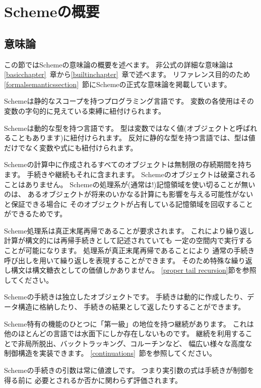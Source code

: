 
\chapter{Schemeの概要}

\section{意味論}
\label{semanticsection}

この節ではSchemeの意味論の概要を述べます。
非公式の詳細な意味論は\ref{basicchapter}~章から\ref{builtinchapter}~章で述べます。
リファレンス目的のため
\ref{formalsemanticssection}~節にSchemeの正式な意味論を掲載しています。

\vest Schemeは静的なスコープを持つプログラミング言語です。
変数の各使用はその変数の字句的に見えている束縛に紐付けられます。

\vest Schemeは動的な型を持つ言語です。
型は変数ではなく値(オブジェクトと呼ばれることもあります)に紐付けられます。
反対に静的な型を持つ言語では、型は値だけでなく変数や式にも紐付けられます。

\vest Schemeの計算中に作成されるすべてのオブジェクトは無制限の存続期間を持ちます。
手続きや継続もそれに含まれます。
Schemeのオブジェクトは破棄されることはありません。
Schemeの処理系が(通常は!)記憶領域を使い切ることが無いのは、
あるオブジェクトが将来のいかなる計算にも影響を与える可能性がないと保証できる場合に
そのオブジェクトが占有している記憶領域を回収することができるためです。

\vest Scheme処理系は真正末尾再帰であることが要求されます。
これにより繰り返し計算が構文的には再帰手続きとして記述されていても
一定の空間内で実行することが可能になります。
処理系が真正末尾再帰であることにより
通常の手続き呼び出しを用いて繰り返しを表現することができます。
そのため特殊な繰り返し構文は構文糖衣としての価値しかありません。
\ref{proper tail recursion}節を参照してください。

\vest Schemeの手続きは独立したオブジェクトです。
手続きは動的に作成したり、データ構造に格納したり、
手続きの結果として返したりすることができます。

\vest Scheme特有の機能のひとつに「第一級」の地位を持つ継続があります。
これは他のほとんどの言語では水面下にしか存在しないものです。
継続を利用することで非局所脱出、バックトラッキング、コルーチンなど、
幅広い様々な高度な制御構造を実装できます。
\ref{continuations}~節を参照してください。

\vest Schemeの手続きの引数は常に値渡しです。
つまり実引数の式は手続きが制御を得る前に
必要とされるか否かに関わらず評価されます。

